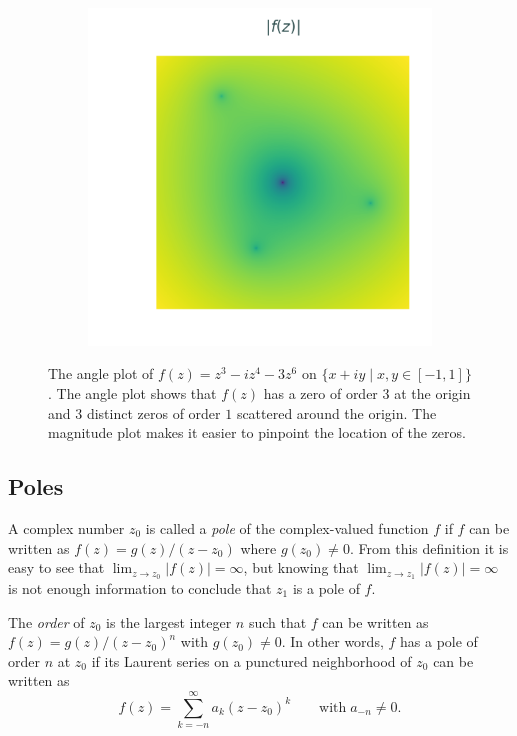 \begin{figure}[H]
\begin{subfigure}{.49\textwidth}
    \includegraphics[width=\textwidth]{figures/zeros_magnitude.png}
\end{subfigure}
\caption{The angle plot of $f(z)=z^3 - iz^4 - 3z^6$ on $\{x+iy \mid x,y \in [-1,1]\}$. The angle plot shows that $f(z)$ has a zero of order $3$ at the origin and $3$ distinct zeros of order $1$ scattered around the origin.
The magnitude plot makes it easier to pinpoint the location of the zeros.}
\label{fig:complex-zeros}
\end{figure}

\subsection*{Poles} %

A complex number $z_0$ is called a \emph{pole} of the complex-valued function $f$ if $f$ can be written as $f(z) = g(z) / (z - z_0)$ where $g(z_0) \ne 0$.
From this definition it is easy to see that $\lim_{z\rightarrow z_0}|f(z)| = \infty$, but knowing that $\lim_{z\rightarrow z_1}|f(z)| = \infty$ is not enough information to conclude that $z_1$ is a pole of $f$.

The \emph{order} of $z_0$ is the largest integer $n$ such that $f$ can be written as $f(z) = g(z) / (z - z_0)^n$ with $g(z_0) \ne 0$.
In other words, $f$ has a pole of order $n$ at $z_0$ if its Laurent series on a punctured neighborhood of $z_0$ can be written as
\[
f(z) = \sum_{k=-n}^\infty a_k(z-z_0)^k  \qquad \text{with} \; a_{-n} \neq 0.
\]

